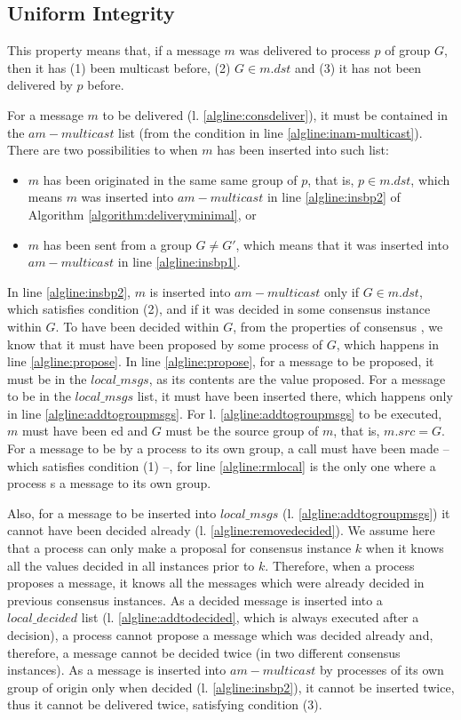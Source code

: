 \documentclass[times, 10pt]{article}
\begin{document}
\subsection{Uniform Integrity}

This property means that, if a message $m$ was delivered to process $p$ of group $G$, then it has (1) been multicast before, (2) $G \in m.dst$ and (3) it has not been delivered by $p$ before.

For a message $m$ to be delivered (l. \ref{algline:consdeliver}), it must be contained in the $am-multicast$ list (from the condition in line \ref{algline:inam-multicast}).  There are two possibilities to when $m$ has been inserted into such list:
\begin{itemize}
  \item $m$ has been originated in the same same group of $p$, that is, $p \in m.dst$, which means $m$ was inserted into $am-multicast$ in line \ref{algline:insbp2} of Algorithm \ref{algorithm:deliveryminimal}, or
  \item $m$ has been sent from a group $G \neq G'$, which means that it was inserted into $am-multicast$ in line \ref{algline:insbp1}. 
\end{itemize}

In line \ref{algline:insbp2}, $m$ is inserted into $am-multicast$ only if $G \in m.dst$, which satisfies condition (2), and if it was decided in some consensus instance within $G$. To have been decided within $G$, from the properties of consensus \cite{lamport1998ptp}, we know that it must have been proposed by some process of $G$, which happens in line \ref{algline:propose}. In line \ref{algline:propose}, for a message to be proposed, it must be in the $local\_msgs$, as its contents are the value proposed. For a message to be in the $local\_msgs$ list, it must have been inserted there, which happens only in line \ref{algline:addtogroupmsgs}. For l. \ref{algline:addtogroupmsgs} to be executed, $m$ must have been \rmdel{}ed and $G$ must be the source group of $m$, that is, $m.src = G$. For a message to be \rmcast{} by a process to its own group, a  call must have been made -- which satisfies condition (1) --, for line \ref{algline:rmlocal} is the only one where a process \rmcast{}s a message to its own group. 

Also, for a message to be inserted into $local\_msgs$ (l. \ref{algline:addtogroupmsgs}) it cannot have been decided already (l. \ref{algline:removedecided}). We assume here that a process can only make a proposal for consensus instance $k$ when it knows all the values decided in all instances prior to $k$. Therefore, when a process proposes a message, it knows all the messages which were already decided in previous consensus instances. As a decided message is inserted into a $local\_decided$ list (l. \ref{algline:addtodecided}, which is always executed after a decision), a process cannot propose a message which was decided already and, therefore, a message cannot be decided twice (in two different consensus instances). As a message is inserted into $am-multicast$ by processes of its own group of origin only when decided (l. \ref{algline:insbp2}), it cannot be inserted twice, thus it cannot be delivered twice, satisfying condition (3).
\end{document}
